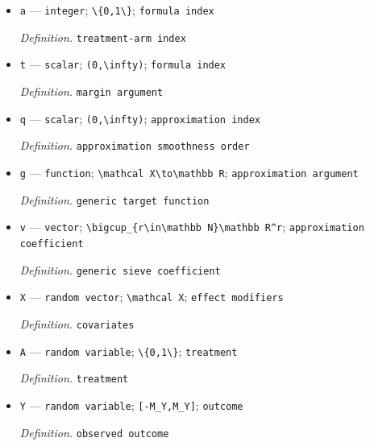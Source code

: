 \documentclass{article}
\begin{document}
\begin{itemize}
  \par\smallskip\noindent\emph{Definition.} \texttt{coordinate index}
  \item \texttt{a} --- \texttt{integer}; \texttt{\textbackslash{}\allowbreak{}\{0,\allowbreak{}1\textbackslash{}\allowbreak{}\}\allowbreak{}}; \texttt{formula index}
  \par\smallskip\noindent\emph{Definition.} \texttt{treatment-\allowbreak{}arm index}
  \item \texttt{t} --- \texttt{scalar}; \texttt{(0,\allowbreak{}\textbackslash{}\allowbreak{}infty)}; \texttt{formula index}
  \par\smallskip\noindent\emph{Definition.} \texttt{margin argument}
  \item \texttt{q} --- \texttt{scalar}; \texttt{(0,\allowbreak{}\textbackslash{}\allowbreak{}infty)}; \texttt{approximation index}
  \par\smallskip\noindent\emph{Definition.} \texttt{approximation smoothness order}
  \item \texttt{g} --- \texttt{function}; \texttt{\textbackslash{}\allowbreak{}mathcal X\textbackslash{}\allowbreak{}to\textbackslash{}\allowbreak{}mathbb R}; \texttt{approximation argument}
  \par\smallskip\noindent\emph{Definition.} \texttt{generic target function}
  \item \texttt{v} --- \texttt{vector}; \texttt{\textbackslash{}\allowbreak{}bigcup\_\allowbreak{}\{r\textbackslash{}\allowbreak{}in\textbackslash{}\allowbreak{}mathbb N\}\allowbreak{}\textbackslash{}\allowbreak{}mathbb R\textasciicircum{}r}; \texttt{approximation coefficient}
  \par\smallskip\noindent\emph{Definition.} \texttt{generic sieve coefficient}
  \item \texttt{X} --- \texttt{random vector}; \texttt{\textbackslash{}\allowbreak{}mathcal X}; \texttt{effect modifiers}
  \par\smallskip\noindent\emph{Definition.} \texttt{covariates}
  \item \texttt{A} --- \texttt{random variable}; \texttt{\textbackslash{}\allowbreak{}\{0,\allowbreak{}1\textbackslash{}\allowbreak{}\}\allowbreak{}}; \texttt{treatment}
  \par\smallskip\noindent\emph{Definition.} \texttt{treatment}
  \item \texttt{Y} --- \texttt{random variable}; \texttt{[-\allowbreak{}M\_\allowbreak{}Y,\allowbreak{}M\_\allowbreak{}Y]}; \texttt{outcome}
  \par\smallskip\noindent\emph{Definition.} \texttt{observed outcome}

\end{itemize}
\end{document}

